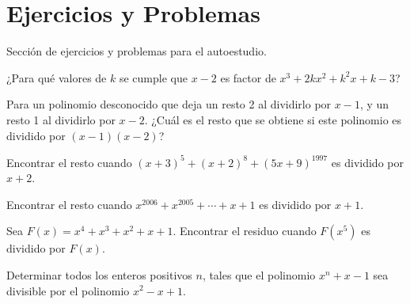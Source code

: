\section{Ejercicios y Problemas}
{
    Sección de ejercicios y problemas para el autoestudio.

    \begin{section-problem}
        ¿Para qué valores de $k$ se cumple que $x - 2$ es factor de $x^3 + 2kx^2 + k^2 x + k - 3$?
    \end{section-problem}

    \begin{section-problem}
        Para un polinomio desconocido que deja un resto 2 al dividirlo por $x - 1$, y un resto 1 al dividirlo por $x - 2$.
        ¿Cuál es el resto que se obtiene si este polinomio es dividido por $(x - 1)(x - 2)$?
    \end{section-problem}

    \begin{section-problem}
        Encontrar el resto cuando $(x + 3)^5 + (x + 2)^8 + (5x + 9)^{1997}$ es dividido por $x + 2$.
    \end{section-problem}

    \begin{section-problem}
        Encontrar el resto cuando $x^{2006} + x^{2005} + \cdots + x + 1$ es dividido por $x + 1$.
    \end{section-problem}

    \begin{section-problem}
        Sea $F(x) = x^4 + x^3 + x^2 + x + 1$. Encontrar el residuo cuando $F(x^5)$ es dividido por $F(x)$.
    \end{section-problem}

    \begin{section-problem}
        Determinar todos los enteros positivos $n$, tales que el polinomio $x^n + x - 1$ sea divisible por el polinomio $x^2 - x + 1$.
    \end{section-problem}
}
